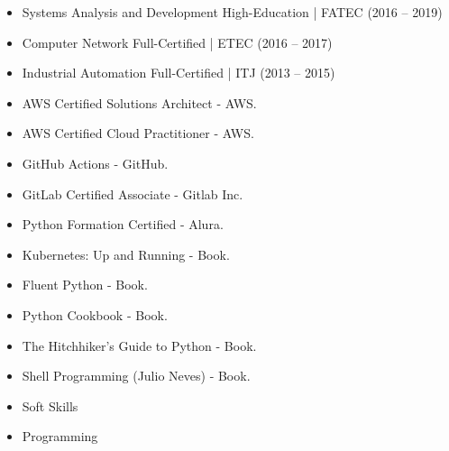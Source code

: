\bigskip
\bigskip


\begin{itemize}
    \item Systems Analysis and Development \newline High-Education | FATEC (2016 -- 2019)
    \item Computer Network \newline Full-Certified | ETEC (2016 -- 2017)
    \item Industrial Automation \newline Full-Certified | ITJ (2013 -- 2015)
\end{itemize}

\bigskip
\bigskip


\begin{itemize}
    \item AWS Certified Solutions Architect - AWS.
    \item AWS Certified Cloud Practitioner - AWS.
    \item GitHub Actions - GitHub.
    \item GitLab Certified Associate - Gitlab Inc.
    \item Python Formation Certified - Alura.
    \item Kubernetes: Up and Running - Book.
    \item Fluent Python - Book.
    \item Python Cookbook - Book.
    \item The Hitchhiker's Guide to Python - Book.
    \item Shell Programming (Julio Neves) - Book.
\end{itemize}

\bigskip
\bigskip


\begin{itemize}
    \item Soft Skills
\end{itemize}


\divider

\begin{itemize}
    \item Programming
\end{itemize}


